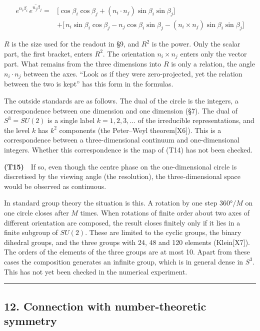 \documentclass[
  a4paper,
]{article}
\begin{document}
\[
\begin{aligned}
e^{n_i\beta_i}\,\overline{e^{n_j\beta_j}}={}&\bigl[\cos\beta_i\cos\beta_j+(n_i\cdot n_j)\sin\beta_i\sin\beta_j\bigr]\\
&+\bigl[\,n_i\sin\beta_i\cos\beta_j-n_j\cos\beta_i\sin\beta_j-(n_i\times n_j)\sin\beta_i\sin\beta_j\bigr]
\end{aligned}
\]

\(R\) is the size used for the readout in §9, and \(R^2\) is the power.
Only the scalar part, the first bracket, enters \(R^2\). The orientation
\(n_i\times n_j\) enters only the vector part. What remains from the
three dimensions into \(R\) is only a relation, the angle
\(n_i\cdot n_j\) between the axes. ``Look as if they were
zero-projected, yet the relation between the two is kept'' has this form
in the formulas.

The outside standards are as follows. The dual of the circle is the
integers, a correspondence between one dimension and one dimension (§7).
The dual of \(S^3=SU(2)\) is a single label \(k=1,2,3,\ldots\) of the
irreducible representations, and the level \(k\) has \(k^2\) components
(the Peter--Weyl theorem{[}X6{]}). This is a correspondence between a
three-dimensional continuum and one-dimensional integers. Whether this
correspondence is the map of (T14) has not been checked.

\textbf{(T15)}　If so, even though the centre phase on the
one-dimensional circle is discretised by the viewing angle (the
resolution), the three-dimensional space would be observed as
continuous.

In standard group theory the situation is this. A rotation by one step
\(360°/M\) on one circle closes after \(M\) times. When rotations of
finite order about two axes of different orientation are composed, the
result closes finitely only if it lies in a finite subgroup of
\(SU(2)\). These are limited to the cyclic groups, the binary dihedral
groups, and the three groups with 24, 48 and 120 elements
(Klein{[}X7{]}). The orders of the elements of the three groups are at
most 10. Apart from these cases the composition generates an infinite
group, which is in general dense in \(S^3\). This has not yet been
checked in the numerical experiment.

\begin{center}\rule{0.5\linewidth}{0.5pt}\end{center}

\subsection{12. Connection with number-theoretic
symmetry}\label{connection-with-number-theoretic-symmetry}
\end{document}
